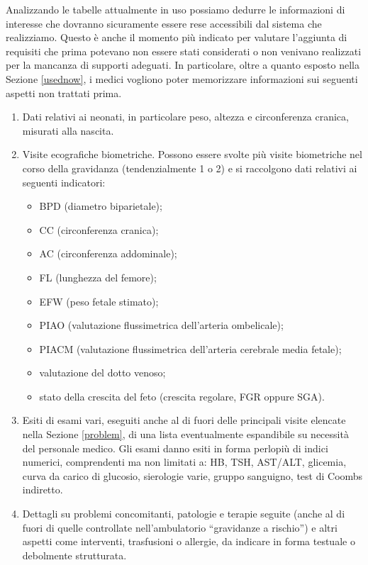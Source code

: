 Analizzando le tabelle attualmente in uso possiamo dedurre le informazioni di interesse che dovranno sicuramente essere rese accessibili dal sistema che realizziamo.
Questo è anche il momento più indicato per valutare l'aggiunta di requisiti che prima potevano non essere stati considerati o non venivano realizzati per la mancanza di supporti adeguati.
In particolare, oltre a quanto esposto nella Sezione \ref{usednow}, i medici vogliono poter memorizzare informazioni sui seguenti aspetti non trattati prima.
\begin{enumerate}
\item Dati relativi ai neonati, in particolare peso, altezza e circonferenza cranica, misurati alla nascita.
\item Visite ecografiche biometriche. Possono essere svolte più visite biometriche nel corso della gravidanza (tendenzialmente 1 o 2) e si raccolgono dati relativi ai seguenti indicatori:
    \begin{itemize}
    \item BPD (diametro biparietale);
    \item CC (circonferenza cranica);
    \item AC (circonferenza addominale);
    \item FL (lunghezza del femore);
    \item EFW (peso fetale stimato);
    \item PIAO (valutazione flussimetrica dell'arteria ombelicale);
    \item PIACM (valutazione flussimetrica dell'arteria cerebrale media fetale);
    \item valutazione del dotto venoso;
    \item stato della crescita del feto (crescita regolare, FGR oppure SGA).
    \end{itemize}
\item Esiti di esami vari, eseguiti anche al di fuori delle principali visite elencate nella Sezione \ref{problem}, di una lista eventualmente espandibile su necessità del personale medico. Gli esami danno esiti in forma perlopiù di indici numerici, comprendenti ma non limitati a: HB, TSH, AST/ALT, glicemia, curva da carico di glucosio, sierologie varie, gruppo sanguigno, test di Coombs indiretto.
\item Dettagli su problemi concomitanti, patologie e terapie seguite (anche al di fuori di quelle controllate nell'ambulatorio \enquote{gravidanze a rischio}) e altri aspetti come interventi, trasfusioni o allergie, da indicare in forma testuale o debolmente strutturata.
\end{enumerate}

